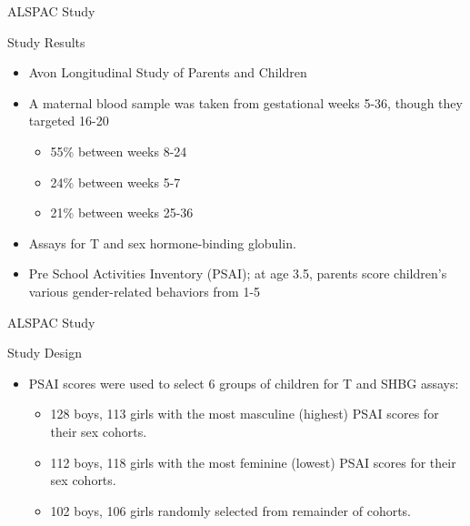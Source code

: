 \documentclass[hyperref={pdfpagelabels=false}]{beamer}
\begin{document}
\begin{frame}{ALSPAC Study \citep{hinesetal2002}}
\begin{block}{Study Results}
	\begin{itemize}
	\item Avon Longitudinal Study of Parents and Children \citep{alspac2001}
	\item A maternal blood sample was taken from gestational weeks 5-36, though they targeted 16-20
		\begin{itemize}
			\item 55\% between weeks 8-24
			\item 24\% between weeks 5-7
			\item 21\% between weeks 25-36
		\end{itemize}
	\item Assays for T and sex hormone-binding globulin.
	\item Pre School Activities Inventory (PSAI); at age 3.5, parents score children's various gender-related behaviors from 1-5
	\end{itemize}
\end{block}
\end{frame}

\begin{frame}{ALSPAC Study \citep{hinesetal2002}}
\begin{block}{Study Design}
	\begin{itemize}
	\item PSAI scores were used to select 6 groups of children for T and SHBG assays:
		\begin{itemize}
			\item 128 boys, 113 girls with the most masculine (highest) PSAI scores for their sex cohorts.
			\item 112 boys, 118 girls with the most feminine (lowest) PSAI scores for their sex cohorts.
			\item 102 boys, 106 girls randomly selected from remainder of cohorts.
		\end{itemize}
	\end{itemize}
\end{block}
\end{frame}
\end{document}
